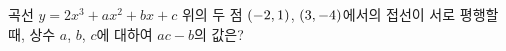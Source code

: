 곡선 $y=2x^3+ax^2+bx+c$ 위의 두 점 $(-2{,}\mkern3mu\mathopen{}1)$, $(3{,}\mkern3mu\mathopen{}-4)$에서의 접선이 서로 평행할 때, 상수 $a$, $b$, $c$에 대하여 $ac-b$의 값은?
